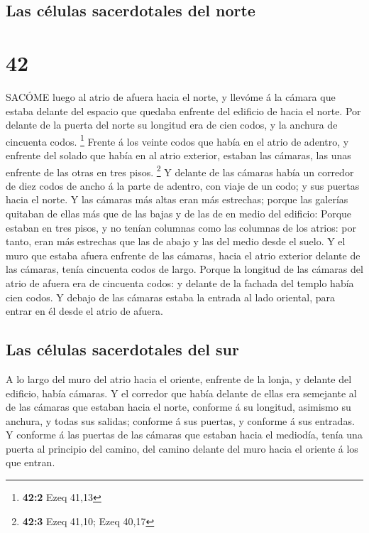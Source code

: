 \hypertarget{las-cuxe9lulas-sacerdotales-del-norte}{%
\subsection{Las células sacerdotales del
norte}\label{las-cuxe9lulas-sacerdotales-del-norte}}

\hypertarget{section-41}{%
\section{42}\label{section-41}}

 SACÓME luego al atrio de afuera hacia el norte, y llevóme á
la cámara que estaba delante del espacio que quedaba enfrente del
edificio de hacia el norte.  Por delante de la puerta del
norte su longitud era de cien codos, y la anchura de cincuenta codos.
\footnote{\textbf{42:2} Ezeq 41,13}  Frente á los veinte
codos que había en el atrio de adentro, y enfrente del solado que había
en al atrio exterior, estaban las cámaras, las unas enfrente de las
otras en tres pisos. \footnote{\textbf{42:3} Ezeq 41,10; Ezeq 40,17}
 Y delante de las cámaras había un corredor de diez codos de
ancho á la parte de adentro, con viaje de un codo; y sus puertas hacia
el norte.  Y las cámaras más altas eran más estrechas;
porque las galerías quitaban de ellas más que de las bajas y de las de
en medio del edificio:  Porque estaban en tres pisos, y no
tenían columnas como las columnas de los atrios: por tanto, eran más
estrechas que las de abajo y las del medio desde el suelo. 
Y el muro que estaba afuera enfrente de las cámaras, hacia el atrio
exterior delante de las cámaras, tenía cincuenta codos de largo.
 Porque la longitud de las cámaras del atrio de afuera era
de cincuenta codos: y delante de la fachada del templo había cien codos.
 Y debajo de las cámaras estaba la entrada al lado oriental,
para entrar en él desde el atrio de afuera.

\hypertarget{las-cuxe9lulas-sacerdotales-del-sur}{%
\subsection{Las células sacerdotales del
sur}\label{las-cuxe9lulas-sacerdotales-del-sur}}

 A lo largo del muro del atrio hacia el oriente, enfrente
de la lonja, y delante del edificio, había cámaras.  Y el
corredor que había delante de ellas era semejante al de las cámaras que
estaban hacia el norte, conforme á su longitud, asimismo su anchura, y
todas sus salidas; conforme á sus puertas, y conforme á sus entradas.
 Y conforme á las puertas de las cámaras que estaban hacia
el mediodía, tenía una puerta al principio del camino, del camino
delante del muro hacia el oriente á los que entran.

